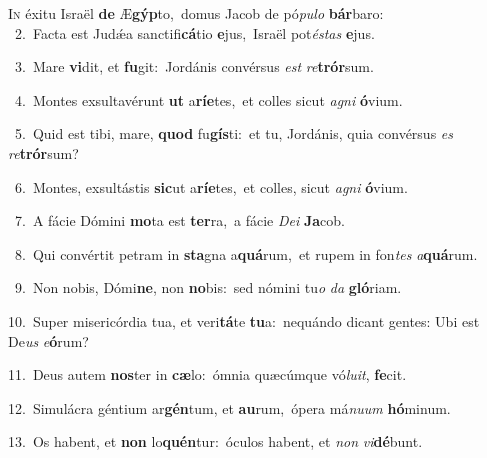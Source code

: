 \lettrine{\initial\textcolor{\initialcolor}{I}}{n} éxitu Israël \textbf{de} Æ\-\textbf{gýp}\-to,~\star domus Jacob de pó\-\textit{pu}\-\textit{lo} \textbf{bár}\-baro:\\
{\numbfont\textcolor{\numbcolor}{~2.}}~Facta est Judǽa sanctifi\-\textbf{cá}\-tio \textbf{e}\-jus,~\star Israël pot\-\textit{és}\-\textit{tas} \textbf{e}\-jus.\par
{\numbfont\textcolor{\numbcolor}{~3.}}~Mare \textbf{vi}\-dit, et \textbf{fu}\-git:~\star Jordánis convérsus \textit{est} \textit{re}\-\textbf{trór}sum.\par
{\numbfont\textcolor{\numbcolor}{~4.}}~Montes exsultavérunt \textbf{ut} a\-\textbf{rí}\-\textbf{e}tes,~\star et colles sicut \textit{a}\-\textit{gni} \textbf{ó}\-vium.\par
{\numbfont\textcolor{\numbcolor}{~5.}}~Quid est tibi, mare, \textbf{quod} fu\-\textbf{gís}\-ti:~\star et tu, Jordánis, quia convérsus \textit{es} \textit{re}\-\textbf{trór}sum?\par
{\numbfont\textcolor{\numbcolor}{~6.}}~Montes, exsultástis \textbf{sic}\-ut a\-\textbf{rí}\-\textbf{e}tes,~\star et colles, sicut \textit{a}\-\textit{gni} \textbf{ó}\-vium.\par
{\numbfont\textcolor{\numbcolor}{~7.}}~A fácie Dómini \textbf{mo}\-ta est \textbf{ter}\-ra,~\star a fácie \textit{De}\-\textit{i} \textbf{Ja}\-cob.\par
{\numbfont\textcolor{\numbcolor}{~8.}}~Qui convértit petram in \textbf{sta}\-gna a\-\textbf{quá}\-rum,~\star et rupem in fon\textit{tes} \textit{a}\-\textbf{quá}rum.\par
{\numbfont\textcolor{\numbcolor}{~9.}}~Non nobis, Dómi\-\textbf{ne}\-, non \textbf{no}\-bis:~\star sed nómini tu\textit{o} \textit{da} \textbf{gló}\-riam.\par
{\numbfont\textcolor{\numbcolor}{10.}}~Super misericórdia tua, et veri\-\textbf{tá}\-te \textbf{tu}\-a:~\star nequándo dicant gentes: Ubi est De\textit{us} \textit{e}\-\textbf{ó}rum?\par
{\numbfont\textcolor{\numbcolor}{11.}}~Deus autem \textbf{nos}\-ter in \textbf{cæ}\-lo:~\star ómnia quæcúmque vó\-\textit{lu}\-\textit{it}, \textbf{fe}\-cit.\par
{\numbfont\textcolor{\numbcolor}{12.}}~Simulácra géntium ar\-\textbf{gén}\-tum, et \textbf{au}\-rum,~\star ópera má\-\textit{nu}\-\textit{um} \textbf{hó}\-minum.\par
{\numbfont\textcolor{\numbcolor}{13.}}~Os habent, et \textbf{non} lo\-\textbf{quén}\-tur:~\star óculos habent, et \textit{non} \textit{vi}\-\textbf{dé}bunt.\par
